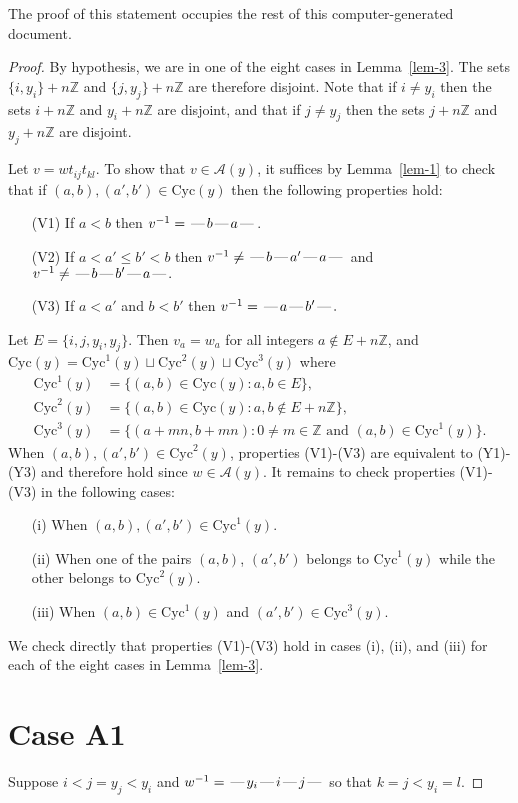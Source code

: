 \documentclass[10pt]{article}
\theoremstyle{definition}
\theoremstyle{definition}
\def\dash{\text{\hspace{0.5mm}---\hspace{0.5mm}}}
\def\Cyc{\mathrm{Cyc}}
\def\ZZ{\mathbb{Z}}
\def\cA{\mathcal{A}}
\begin{document}
The proof of this statement occupies the rest of this computer-generated document.
\begin{proof}
By hypothesis, we are in one of the eight cases in Lemma~\ref{lem-3}.
The sets $\{i,y_i\} + n\ZZ$ and $\{j,y_j\} + n \ZZ$ are therefore disjoint.
Note that if $i \neq y_i$ then the sets $i + n\ZZ$ and $y_i + n \ZZ$ are disjoint,
and that if $j \neq y_j$ then the sets $j + n\ZZ$ and $y_j + n\ZZ$ are disjoint.

Let $v = wt_{ij}t_{kl}$.
To show that $v \in \cA(y)$, it suffices by Lemma~\ref{lem-1}
to check that if $(a,b),(a',b') \in \Cyc(y)$ then the following properties hold:
\begin{enumerate}
\item[(V1)] If $a < b$ then $v^{-1} = \dash b \dash a \dash$.
\item[(V2)] If $a < a' \leq b' < b$ then $v^{-1} \neq \dash b \dash a' \dash a \dash$
and $v^{-1}\neq \dash b \dash b' \dash a \dash.$
\item[(V3)] If $a < a'$ and $b < b'$ then $v^{-1} = \dash a \dash b' \dash.$
\end{enumerate}
Let $E = \{i, j, y_i, y_j\}$.
Then $v_a = w_a$ for all integers $a \notin E + n\ZZ$,
and
$
\Cyc(y) = \Cyc^1(y) \sqcup \Cyc^2(y) \sqcup \Cyc^3(y)
$
where
\[
\begin{aligned}
\Cyc^1(y) &= \{ (a,b) \in \Cyc(y): a,b \in E\},\\
\Cyc^2(y) &= \{ (a,b) \in \Cyc(y): a,b \notin E + n\ZZ\},\\
\Cyc^3(y) &= \{ (a+mn,b+mn): 0 \neq m \in \ZZ\text{ and }(a,b)\in \Cyc^1(y)\}.
\end{aligned}
\]
When $(a,b),(a',b') \in \Cyc^2(y)$,
properties (V1)-(V3) are equivalent to (Y1)-(Y3)
and therefore hold since $w \in \cA(y)$.
It remains to check properties (V1)-(V3) in the following cases:
\begin{itemize}
\item[(i)] When $(a,b),(a',b') \in \Cyc^1(y)$.
\item[(ii)] When one of the pairs $(a,b)$, $(a',b')$ belongs to $\Cyc^1(y)$ while the other belongs to $\Cyc^2(y)$.
\item[(iii)] When $(a,b) \in \Cyc^1(y)$ and $(a',b') \in \Cyc^3(y)$.
\end{itemize}
We check directly that properties (V1)-(V3) hold in cases (i), (ii), and (iii)
for each of the eight cases in Lemma~\ref{lem-3}.

\section{Case A1}
Suppose $i < j = y_j < y_i$ and $w^{-1} = \dash y_i\dash i\dash j\dash $ so that $k=j < y_i=l$.

\end{proof}
\end{document}
